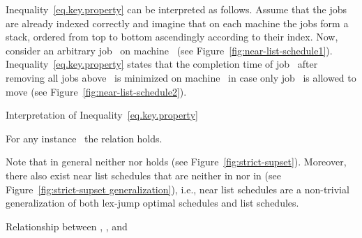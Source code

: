\documentclass[a4paper,11pt,fleqn]{article}
\begin{document}
Inequality~\eqref{eq.key.property} can be interpreted as follows. Assume that the jobs are already indexed correctly and imagine that on each machine the jobs form a stack, ordered from top to bottom ascendingly according to their index. Now, consider an arbitrary job~ on machine~ (see Figure~\ref{fig:near-list-schedule1}). Inequality~\eqref{eq.key.property} states that the completion time of job~ after removing all jobs above~ is minimized on machine~ in case only job~ is allowed to move (see Figure~\ref{fig:near-list-schedule2}).

\begin{artclfig}\newcommand{\height}{10em}
  \hspace{5ex}
  \caption{Interpretation of Inequality~\eqref{eq.key.property}}
\end{artclfig}

\begin{lemma}
\label{lemma.NL}
For any instance~ the relation  holds.
\end{lemma}

Note that in general neither  nor  holds (see Figure~\ref{fig:strict-supset}). Moreover, there also exist near list schedules that are neither in  nor in  (see Figure~\ref{fig:strict-supset generalization}), i.e., near list schedules are a non-trivial generalization of both lex-jump optimal schedules and list schedules.

\begin{artclfig}
\newcommand{\height}{10em}
  \hspace{5ex}
  \hspace{5ex}
  \caption{Relationship between , , and }
  \label{fig:strict-supset}
\end{artclfig}
\end{document}
